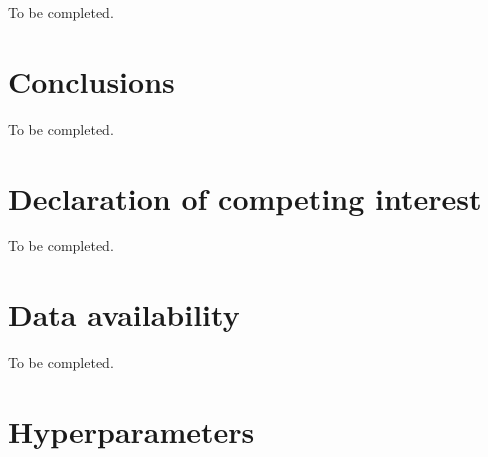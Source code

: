 \documentclass[preprint,12pt]{elsarticle}
\begin{document}
To be completed.

\section{Conclusions}\label{sec:conclusion}

To be completed.

\section*{Declaration of competing interest}

To be completed.

\section*{Data availability}

To be completed.

\appendix
\section{Hyperparameters}\label{app:hyper}
\end{document}

